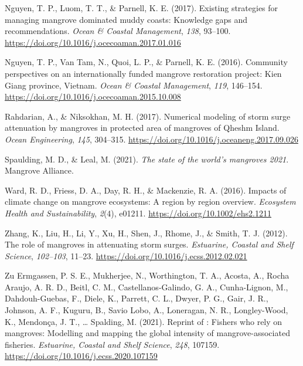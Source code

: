\documentclass[
  12pt,
]{article}
\newlength{\cslhangindent}
\newlength{\cslentryspacingunit} %
\newenvironment{CSLReferences}[2] %
 {%
  \setlength{\parindent}{0pt}
  \ifodd #1
  \let\oldpar\par
  \def\par{\hangindent=\cslhangindent\oldpar}
  \fi
  \setlength{\parskip}{#2\cslentryspacingunit}
 }%
 {}
\begin{document}
\begin{CSLReferences}{1}{2}
\leavevmode{}%
Nguyen, T. P., Luom, T. T., \& Parnell, K. E. (2017). Existing strategies for managing mangrove dominated muddy coasts: {Knowledge} gaps and recommendations. \emph{Ocean \& Coastal Management}, \emph{138}, 93--100. \url{https://doi.org/10.1016/j.ocecoaman.2017.01.016}

\leavevmode{}%
Nguyen, T. P., Van Tam, N., Quoi, L. P., \& Parnell, K. E. (2016). Community perspectives on an internationally funded mangrove restoration project: {Kien Giang} province, {Vietnam}. \emph{Ocean \& Coastal Management}, \emph{119}, 146--154. \url{https://doi.org/10.1016/j.ocecoaman.2015.10.008}

\leavevmode{}%
Rahdarian, A., \& Niksokhan, M. H. (2017). Numerical modeling of storm surge attenuation by mangroves in protected area of mangroves of {Qheshm Island}. \emph{Ocean Engineering}, \emph{145}, 304--315. \url{https://doi.org/10.1016/j.oceaneng.2017.09.026}

\leavevmode{}%
Spaulding, M. D., \& Leal, M. (2021). \emph{The state of the world's mangroves 2021}. Mangrove Alliance.

\leavevmode{}%
Ward, R. D., Friess, D. A., Day, R. H., \& Mackenzie, R. A. (2016). Impacts of climate change on mangrove ecosystems: A region by region overview. \emph{Ecosystem Health and Sustainability}, \emph{2}(4), e01211. \url{https://doi.org/10.1002/ehs2.1211}

\leavevmode{}%
Zhang, K., Liu, H., Li, Y., Xu, H., Shen, J., Rhome, J., \& Smith, T. J. (2012). The role of mangroves in attenuating storm surges. \emph{Estuarine, Coastal and Shelf Science}, \emph{102--103}, 11--23. \url{https://doi.org/10.1016/j.ecss.2012.02.021}

\leavevmode{}%
Zu Ermgassen, P. S. E., Mukherjee, N., Worthington, T. A., Acosta, A., Rocha Araujo, A. R. D., Beitl, C. M., Castellanos-Galindo, G. A., Cunha-Lignon, M., Dahdouh-Guebas, F., Diele, K., Parrett, C. L., Dwyer, P. G., Gair, J. R., Johnson, A. F., Kuguru, B., Savio Lobo, A., Loneragan, N. R., Longley-Wood, K., Mendonça, J. T., \ldots{} Spalding, M. (2021). Reprint of : {Fishers} who rely on mangroves: {Modelling} and mapping the global intensity of mangrove-associated fisheries. \emph{Estuarine, Coastal and Shelf Science}, \emph{248}, 107159. \url{https://doi.org/10.1016/j.ecss.2020.107159}

\end{CSLReferences}
\end{document}
